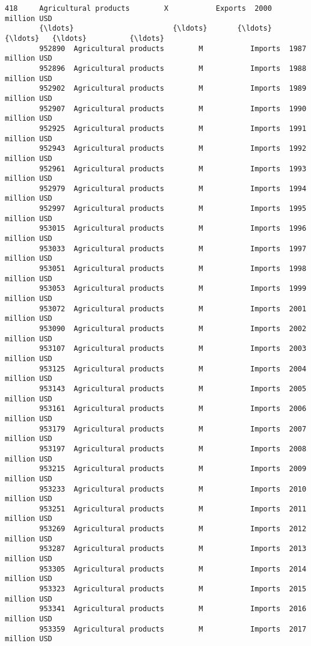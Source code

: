 \documentclass[11pt]{article}
\begin{document}
\begin{Verbatim}[commandchars=\\\{\}]
        418     Agricultural products        X           Exports  2000  million USD   
        {\ldots}                       {\ldots}       {\ldots}              {\ldots}   {\ldots}          {\ldots}   
        952890  Agricultural products        M           Imports  1987  million USD   
        952896  Agricultural products        M           Imports  1988  million USD   
        952902  Agricultural products        M           Imports  1989  million USD   
        952907  Agricultural products        M           Imports  1990  million USD   
        952925  Agricultural products        M           Imports  1991  million USD   
        952943  Agricultural products        M           Imports  1992  million USD   
        952961  Agricultural products        M           Imports  1993  million USD   
        952979  Agricultural products        M           Imports  1994  million USD   
        952997  Agricultural products        M           Imports  1995  million USD   
        953015  Agricultural products        M           Imports  1996  million USD   
        953033  Agricultural products        M           Imports  1997  million USD   
        953051  Agricultural products        M           Imports  1998  million USD   
        953053  Agricultural products        M           Imports  1999  million USD   
        953072  Agricultural products        M           Imports  2001  million USD   
        953090  Agricultural products        M           Imports  2002  million USD   
        953107  Agricultural products        M           Imports  2003  million USD   
        953125  Agricultural products        M           Imports  2004  million USD   
        953143  Agricultural products        M           Imports  2005  million USD   
        953161  Agricultural products        M           Imports  2006  million USD   
        953179  Agricultural products        M           Imports  2007  million USD   
        953197  Agricultural products        M           Imports  2008  million USD   
        953215  Agricultural products        M           Imports  2009  million USD   
        953233  Agricultural products        M           Imports  2010  million USD   
        953251  Agricultural products        M           Imports  2011  million USD   
        953269  Agricultural products        M           Imports  2012  million USD   
        953287  Agricultural products        M           Imports  2013  million USD   
        953305  Agricultural products        M           Imports  2014  million USD   
        953323  Agricultural products        M           Imports  2015  million USD   
        953341  Agricultural products        M           Imports  2016  million USD   
        953359  Agricultural products        M           Imports  2017  million USD   
        

\end{Verbatim}
\end{document}
